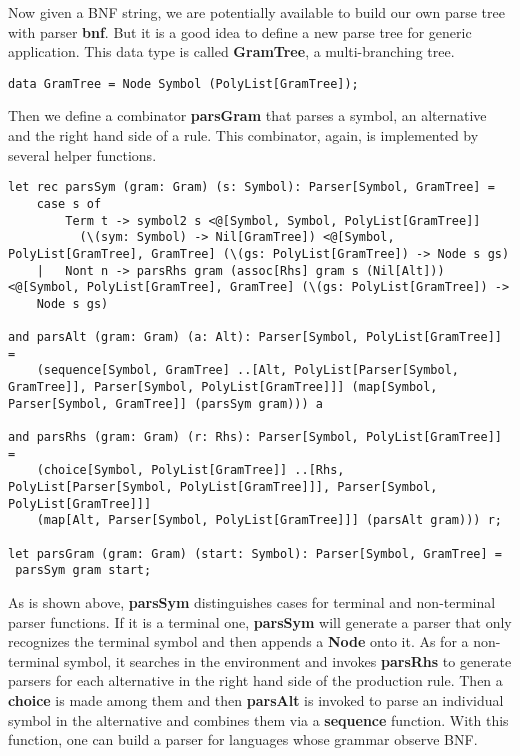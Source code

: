 Now given a BNF string, we are potentially available to build our own parse tree with parser \textbf{bnf}. But it is a good idea to define a new parse tree for generic application. This data type is called \textbf{GramTree}, a multi-branching tree.
\begin{lstlisting}
data GramTree = Node Symbol (PolyList[GramTree]);
\end{lstlisting}
Then we define a combinator \textbf{parsGram} that parses a symbol, an alternative and the right hand side of a rule. This combinator, again, is implemented by several helper functions.
\begin{lstlisting}
let rec parsSym (gram: Gram) (s: Symbol): Parser[Symbol, GramTree] =
    case s of
        Term t -> symbol2 s <@[Symbol, Symbol, PolyList[GramTree]] 
          (\(sym: Symbol) -> Nil[GramTree]) <@[Symbol, PolyList[GramTree], GramTree] (\(gs: PolyList[GramTree]) -> Node s gs)
    |   Nont n -> parsRhs gram (assoc[Rhs] gram s (Nil[Alt])) <@[Symbol, PolyList[GramTree], GramTree] (\(gs: PolyList[GramTree]) -> 
    Node s gs)
    
and parsAlt (gram: Gram) (a: Alt): Parser[Symbol, PolyList[GramTree]] =
    (sequence[Symbol, GramTree] ..[Alt, PolyList[Parser[Symbol, GramTree]], Parser[Symbol, PolyList[GramTree]]] (map[Symbol, Parser[Symbol, GramTree]] (parsSym gram))) a
    
and parsRhs (gram: Gram) (r: Rhs): Parser[Symbol, PolyList[GramTree]] =
    (choice[Symbol, PolyList[GramTree]] ..[Rhs, PolyList[Parser[Symbol, PolyList[GramTree]]], Parser[Symbol, PolyList[GramTree]]] 
    (map[Alt, Parser[Symbol, PolyList[GramTree]]] (parsAlt gram))) r;
    
let parsGram (gram: Gram) (start: Symbol): Parser[Symbol, GramTree] =
 parsSym gram start;
\end{lstlisting}
As is shown above, \textbf{parsSym} distinguishes cases for terminal and non-terminal parser functions. If it is a terminal one, \textbf{parsSym} will generate a parser that only recognizes the terminal symbol and then appends a \textbf{Node} onto it. As for a non-terminal symbol, it searches in the environment and invokes \textbf{parsRhs} to generate parsers for each alternative in the right hand side of the production rule. Then a \textbf{choice} is made among them and then \textbf{parsAlt} is invoked to parse an individual symbol in the alternative and combines them via a \textbf{sequence} function. With this function, one can build a parser for languages whose grammar observe BNF.

